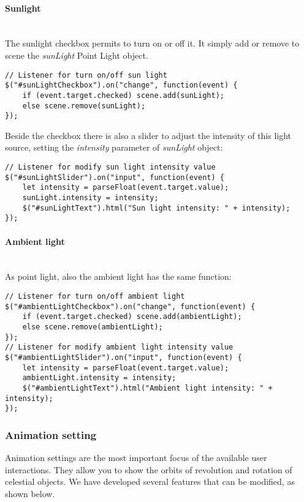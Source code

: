 \documentclass{article}
\begin{document}
\paragraph{Sunlight} \mbox{}\\
The sunlight checkbox permits to turn on or off it. It simply add or remove to scene the \textit{sunLight} Point Light object.
\begin{lstlisting}
// Listener for turn on/off sun light
$("#sunLightCheckbox").on("change", function(event) {
	if (event.target.checked) scene.add(sunLight);
	else scene.remove(sunLight);
});
\end{lstlisting}
Beside the checkbox there is also a slider to adjust the intensity of this light source, setting the \textit{intensity} parameter of \textit{sunLight} object:
\begin{lstlisting}
// Listener for modify sun light intensity value
$("#sunLightSlider").on("input", function(event) {
	let intensity = parseFloat(event.target.value);
	sunLight.intensity = intensity;
	$("#sunLightText").html("Sun light intensity: " + intensity);
});
\end{lstlisting}
\paragraph{Ambient light}\mbox{}\\
As point light, also the ambient light has the same function:
\begin{lstlisting}
// Listener for turn on/off ambient light
$("#ambientLightCheckbox").on("change", function(event) {
	if (event.target.checked) scene.add(ambientLight);
	else scene.remove(ambientLight);
});
// Listener for modify ambient light intensity value
$("#ambientLightSlider").on("input", function(event) {
	let intensity = parseFloat(event.target.value);
	ambientLight.intensity = intensity;
	$("#ambientLightText").html("Ambient light intensity: " + intensity);
});
\end{lstlisting}

\subsubsection{Animation setting}
Animation settings are the most important focus of the available user interactions. They allow you to show the orbits of revolution and rotation of celestial objects. We have developed several features that can be modified, as shown below.
\end{document}
